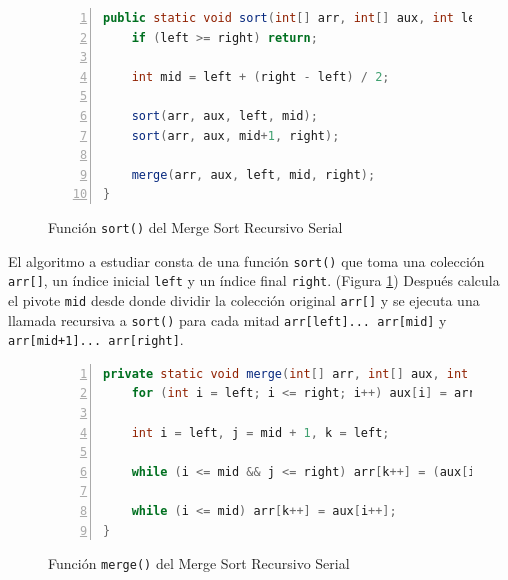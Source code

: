 \documentclass[titlepage]{article}
\begin{document}
\begin{figure}[h]
    \begin{lstlisting}[language=java, frame=single, numbers=left]
public static void sort(int[] arr, int[] aux, int left, int right) {
	if (left >= right) return;
	
	int mid = left + (right - left) / 2;
	
	sort(arr, aux, left, mid);
	sort(arr, aux, mid+1, right);
	
	merge(arr, aux, left, mid, right);
}
    \end{lstlisting}
    \caption{Función \lstinline{sort()} del Merge Sort Recursivo Serial}
    \label{fig:MSRS_sort()}
\end{figure}


El algoritmo a estudiar consta de una función \lstinline|sort()| que toma una colección \lstinline|arr[]|, un índice inicial \lstinline|left| y un índice final \lstinline|right|. (Figura \ref{fig:MSRS_sort()}) Después calcula el pivote \lstinline|mid| desde donde dividir la colección original \lstinline|arr[]| y se ejecuta una llamada recursiva a \lstinline|sort()| para cada mitad \lstinline|arr[left]... arr[mid]| y \lstinline|arr[mid+1]... arr[right]|.

\begin{figure}[h]
    \begin{lstlisting}[language=java, frame=single, numbers=left]
private static void merge(int[] arr, int[] aux, int left, int mid, int right) {
	for (int i = left; i <= right; i++) aux[i] = arr[i];
	
	int i = left, j = mid + 1, k = left;
	
	while (i <= mid && j <= right) arr[k++] = (aux[i] <= aux[j])? aux[i++] : aux[j++];
	
	while (i <= mid) arr[k++] = aux[i++];
}
    \end{lstlisting}
    \caption{Función \lstinline{merge()} del Merge Sort Recursivo Serial}
    \label{fig:MSRS_merge()}
\end{figure}
\end{document}
